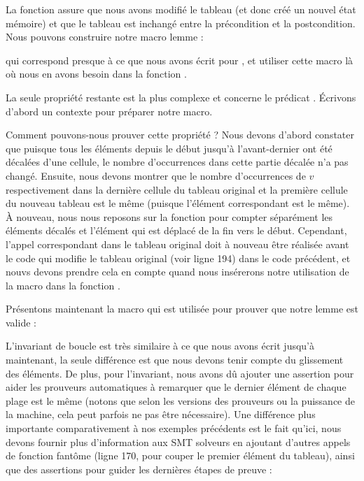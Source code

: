 

La fonction  assure que nous avons 
modifié le tableau (et donc créé un nouvel état mémoire) et que le tableau est
inchangé entre la précondition et la postcondition. Nous pouvons construire 
notre macro lemme :




qui correspond presque à ce que nous avons écrit pour ,
et utiliser cette macro là où nous en avons besoin dans la fonction
.




La seule propriété restante est la plus complexe et concerne le prédicat
. Écrivons d'abord un contexte pour préparer notre
macro.




Comment pouvons-nous prouver cette propriété ? Nous devons d'abord constater
que puisque tous les éléments depuis le début jusqu'à l'avant-dernier ont été
décalées d'une cellule, le nombre d'occurrences dans cette partie décalée n'a
pas changé. Ensuite, nous devons montrer que le nombre d'occurrences de $v$
respectivement dans la dernière cellule du tableau original et la première 
cellule du nouveau tableau est le même (puisque l'élément correspondant est le
même). À nouveau, nous nous reposons sur la fonction  pour compter
séparément les éléments décalés et l'élément qui est déplacé de la fin vers le
début. Cependant, l'appel correspondant dans le tableau original doit à nouveau
être réalisée avant le code qui modifie le tableau original (voir ligne 194) dans
le code précédent, et nouvs devons prendre cela en compte quand nous insérerons
notre utilisation de la macro dans la fonction .


Présentons maintenant la macro qui est utilisée pour prouver que notre lemme
est valide :




L'invariant de boucle est très similaire à ce que nous avons écrit jusqu'à
maintenant, la seule différence est que nous devons tenir compte du glissement
des éléments. De plus, pour l'invariant, nous avons dû ajouter une assertion 
pour aider les prouveurs automatiques à remarquer que le dernier élément de
chaque plage est le même (notons que selon les versions des prouveurs ou la
puissance de la machine, cela peut parfois ne pas être nécessaire). Une différence
plus importante comparativement à nos exemples précédents est le fait qu'ici, nous
devons fournir plus d'information aux SMT solveurs en ajoutant d'autres appels
de fonction fantôme (ligne 170, pour couper le premier élément du tableau), ainsi
que des assertions pour guider les dernières étapes de preuve :



